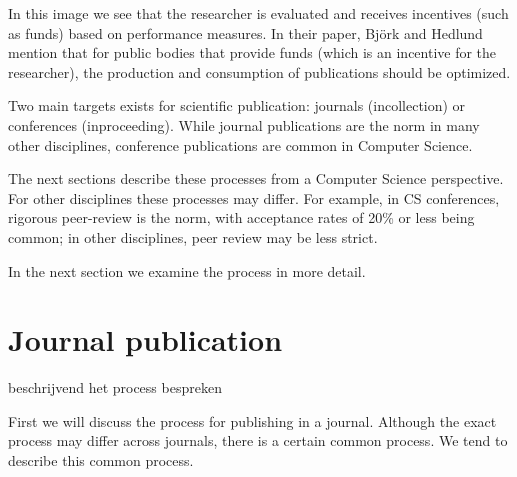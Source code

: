 \documentclass{ou-report}
\newcommand{\todo}[1]{{\color{red} TODO: #1}}
\newcommand{\outline}[1]{{\color{blue} #1}}
\begin{document}
In this image we see that the researcher is evaluated and receives incentives 
(such as funds) based on performance measures. In their paper,  Bj\"ork and 
Hedlund mention that for public bodies that provide funds (which is an incentive 
for the researcher), the production and consumption of publications should be 
optimized.
    


Two main targets exists for scientific publication: journals (incollection) or 
conferences (inproceeding). While journal publications are the norm in many 
other disciplines, conference publications are common in Computer Science.

The next sections describe these processes from a Computer Science perspective. 
For other disciplines these processes may differ. For example, in CS 
conferences, rigorous peer-review is the norm, with acceptance rates of 20\% or 
less being common; in other disciplines, peer review may be less strict.
    
In the next section we examine the process in more detail.


\section{Journal publication}
\outline{
beschrijvend het process bespreken
}

First we will discuss the process for publishing in a journal. Although the 
exact process may differ across journals, there is a certain common process. We 
tend to describe this common process.
\end{document}
